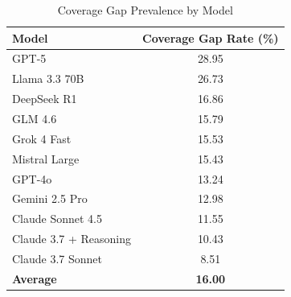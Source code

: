 \begin{table}[htbp]
\centering
\caption{Coverage Gap Prevalence by Model}
\label{tab:coverage_gap_prevalence}
\begin{tabular}{lc}
\toprule
\textbf{Model} & \textbf{Coverage Gap Rate (\%)} \\
\midrule
GPT-5 & 28.95 \\
Llama 3.3 70B & 26.73 \\
DeepSeek R1 & 16.86 \\
GLM 4.6 & 15.79 \\
Grok 4 Fast & 15.53 \\
Mistral Large & 15.43 \\
GPT-4o & 13.24 \\
Gemini 2.5 Pro & 12.98 \\
Claude Sonnet 4.5 & 11.55 \\
Claude 3.7 + Reasoning & 10.43 \\
Claude 3.7 Sonnet & 8.51 \\
\midrule
\textbf{Average} & \textbf{16.00} \\
\bottomrule
\end{tabular}
\end{table}
